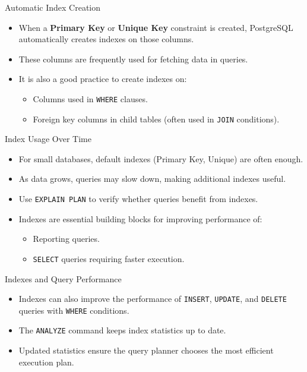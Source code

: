 \documentclass[aspectratio=169]{beamer}
\begin{document}
\begin{frame}{Automatic Index Creation}
  \begin{itemize}
    \item When a \textbf{Primary Key} or \textbf{Unique Key} constraint is created, PostgreSQL automatically creates indexes on those columns.
    \item These columns are frequently used for fetching data in queries.
    \item It is also a good practice to create indexes on:
      \begin{itemize}
        \item Columns used in \texttt{WHERE} clauses.
        \item Foreign key columns in child tables (often used in \texttt{JOIN} conditions).
      \end{itemize}
  \end{itemize}
\end{frame}

\begin{frame}{Index Usage Over Time}
  \begin{itemize}
    \item For small databases, default indexes (Primary Key, Unique) are often enough.
    \item As data grows, queries may slow down, making additional indexes useful.
    \item Use \texttt{EXPLAIN PLAN} to verify whether queries benefit from indexes.
    \item Indexes are essential building blocks for improving performance of:
      \begin{itemize}
        \item Reporting queries.
        \item \texttt{SELECT} queries requiring faster execution.
      \end{itemize}
  \end{itemize}
\end{frame}

\begin{frame}{Indexes and Query Performance}
  \begin{itemize}
    \item Indexes can also improve the performance of \texttt{INSERT}, \texttt{UPDATE}, and \texttt{DELETE} queries with \texttt{WHERE} conditions.
    \item The \texttt{ANALYZE} command keeps index statistics up to date.
    \item Updated statistics ensure the query planner chooses the most efficient execution plan.
  \end{itemize}
\end{frame}
\end{document}
